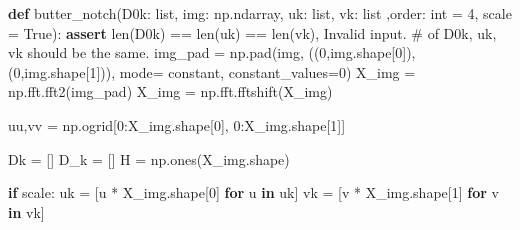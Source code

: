 \documentclass[
]{article}
\newenvironment{Shaded}{}{}
\newcommand{\BuiltInTok}[1]{\textcolor[rgb]{0.00,0.50,0.00}{#1}}
\newcommand{\ControlFlowTok}[1]{\textcolor[rgb]{0.00,0.44,0.13}{\textbf{#1}}}
\newcommand{\DecValTok}[1]{\textcolor[rgb]{0.25,0.63,0.44}{#1}}
\newcommand{\KeywordTok}[1]{\textcolor[rgb]{0.00,0.44,0.13}{\textbf{#1}}}
\newcommand{\NormalTok}[1]{#1}
\newcommand{\OperatorTok}[1]{\textcolor[rgb]{0.40,0.40,0.40}{#1}}
\newcommand{\StringTok}[1]{\textcolor[rgb]{0.25,0.44,0.63}{#1}}
\newcommand{\VariableTok}[1]{\textcolor[rgb]{0.10,0.09,0.49}{#1}}
\begin{document}
\begin{Shaded}
\begin{Highlighting}[]
\KeywordTok{def}\NormalTok{ butter\_notch(D0k: }\BuiltInTok{list}\NormalTok{, img: np.ndarray, uk: }\BuiltInTok{list}\NormalTok{, vk: }\BuiltInTok{list}\NormalTok{ ,order: }\BuiltInTok{int} \OperatorTok{=} \DecValTok{4}\NormalTok{, scale }\OperatorTok{=} \VariableTok{True}\NormalTok{):}
    \ControlFlowTok{assert} \BuiltInTok{len}\NormalTok{(D0k) }\OperatorTok{==} \BuiltInTok{len}\NormalTok{(uk) }\OperatorTok{==} \BuiltInTok{len}\NormalTok{(vk), }\StringTok{\textquotesingle{}Invalid input. \# of D0k, uk, vk should be the same.\textquotesingle{}}
\NormalTok{    img\_pad }\OperatorTok{=}\NormalTok{ np.pad(img, ((}\DecValTok{0}\NormalTok{,img.shape[}\DecValTok{0}\NormalTok{]), (}\DecValTok{0}\NormalTok{,img.shape[}\DecValTok{1}\NormalTok{])), mode}\OperatorTok{=} \StringTok{\textquotesingle{}constant\textquotesingle{}}\NormalTok{, constant\_values}\OperatorTok{=}\DecValTok{0}\NormalTok{)}
\NormalTok{    X\_img }\OperatorTok{=}\NormalTok{ np.fft.fft2(img\_pad)}
\NormalTok{    X\_img }\OperatorTok{=}\NormalTok{ np.fft.fftshift(X\_img)}

\NormalTok{    uu,vv }\OperatorTok{=}\NormalTok{ np.ogrid[}\DecValTok{0}\NormalTok{:X\_img.shape[}\DecValTok{0}\NormalTok{], }\DecValTok{0}\NormalTok{:X\_img.shape[}\DecValTok{1}\NormalTok{]]}

\NormalTok{    Dk }\OperatorTok{=}\NormalTok{ []}
\NormalTok{    D\_k }\OperatorTok{=}\NormalTok{ []}
\NormalTok{    H }\OperatorTok{=}\NormalTok{ np.ones(X\_img.shape)}

    \ControlFlowTok{if}\NormalTok{ scale:}
\NormalTok{        uk }\OperatorTok{=}\NormalTok{ [u }\OperatorTok{*}\NormalTok{ X\_img.shape[}\DecValTok{0}\NormalTok{] }\ControlFlowTok{for}\NormalTok{ u }\KeywordTok{in}\NormalTok{ uk]}
\NormalTok{        vk }\OperatorTok{=}\NormalTok{ [v }\OperatorTok{*}\NormalTok{ X\_img.shape[}\DecValTok{1}\NormalTok{] }\ControlFlowTok{for}\NormalTok{ v }\KeywordTok{in}\NormalTok{ vk]}


\end{Highlighting}
\end{Shaded}
\end{document}
